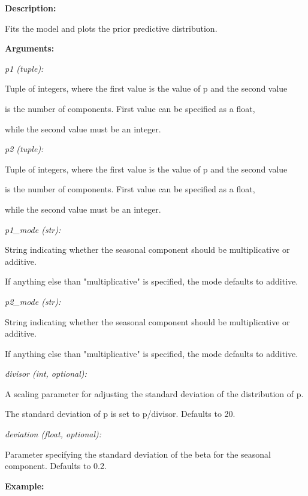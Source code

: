 \documentclass{article}
\begin{document}
\indent \textbf{Description:} 

\indent \indent Fits the model and plots the prior predictive distribution.

\indent \textbf{Arguments:}

\indent \indent \textit{p1 (tuple):} 

\indent \indent \indent Tuple of integers, where the first value is the value of p and the second value

\indent \indent \indent is the number of components. First value can be specified as a float, 

\indent \indent \indent while the second value must be an integer.

\indent \indent \textit{p2 (tuple):} 

\indent \indent \indent Tuple of integers, where the first value is the value of p and the second value

\indent \indent \indent is the number of components. First value can be specified as a float, 

\indent \indent \indent while the second value must be an integer.

\indent \indent \textit{p1\_mode (str):} 

\indent \indent \indent String indicating whether the seasonal component should be
multiplicative or additive. 

\indent \indent \indent If anything else than "multiplicative" is specified,
the mode defaults to additive.

\indent \indent \textit{p2\_mode (str):} 

\indent \indent \indent String indicating whether the seasonal component should be
multiplicative or additive. 

\indent \indent \indent If anything else than "multiplicative" is specified,
the mode defaults to additive.

\indent \indent \textit{divisor (int, optional):} 

\indent \indent \indent A scaling parameter for adjusting the standard deviation of the distribution
of p. 

\indent \indent \indent The standard deviation of p is set to p/divisor. Defaults to 20. 

\indent \indent \textit{deviation (float, optional):} 

\indent \indent \indent Parameter specifying the standard deviation of the beta for the seasonal
component. Defaults to 0.2.

\indent \textbf{Example:}
\end{document}
